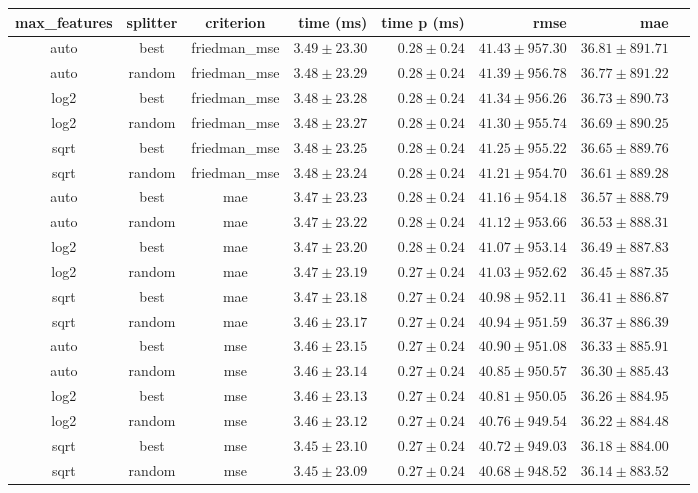 \begin{tabular}{cccrrrrr}
\toprule
\textbf{max\_features} & \textbf{splitter} & \textbf{criterion} & \textbf{time (ms)} & \textbf{time p (ms)} & \textbf{rmse} & \textbf{mae}\\
\midrule
auto & best & friedman_mse & $3.49 \pm 23.30$ & $0.28 \pm 0.24$ & $41.43 \pm 957.30$ & $36.81 \pm 891.71$\\
auto & random & friedman_mse & $3.48 \pm 23.29$ & $0.28 \pm 0.24$ & $41.39 \pm 956.78$ & $36.77 \pm 891.22$\\
log2 & best & friedman_mse & $3.48 \pm 23.28$ & $0.28 \pm 0.24$ & $41.34 \pm 956.26$ & $36.73 \pm 890.73$\\
log2 & random & friedman_mse & $3.48 \pm 23.27$ & $0.28 \pm 0.24$ & $41.30 \pm 955.74$ & $36.69 \pm 890.25$\\
sqrt & best & friedman_mse & $3.48 \pm 23.25$ & $0.28 \pm 0.24$ & $41.25 \pm 955.22$ & $36.65 \pm 889.76$\\
sqrt & random & friedman_mse & $3.48 \pm 23.24$ & $0.28 \pm 0.24$ & $41.21 \pm 954.70$ & $36.61 \pm 889.28$\\
auto & best & mae & $3.47 \pm 23.23$ & $0.28 \pm 0.24$ & $41.16 \pm 954.18$ & $36.57 \pm 888.79$\\
auto & random & mae & $3.47 \pm 23.22$ & $0.28 \pm 0.24$ & $41.12 \pm 953.66$ & $36.53 \pm 888.31$\\
log2 & best & mae & $3.47 \pm 23.20$ & $0.28 \pm 0.24$ & $41.07 \pm 953.14$ & $36.49 \pm 887.83$\\
log2 & random & mae & $3.47 \pm 23.19$ & $0.27 \pm 0.24$ & $41.03 \pm 952.62$ & $36.45 \pm 887.35$\\
sqrt & best & mae & $3.47 \pm 23.18$ & $0.27 \pm 0.24$ & $40.98 \pm 952.11$ & $36.41 \pm 886.87$\\
sqrt & random & mae & $3.46 \pm 23.17$ & $0.27 \pm 0.24$ & $40.94 \pm 951.59$ & $36.37 \pm 886.39$\\
auto & best & mse & $3.46 \pm 23.15$ & $0.27 \pm 0.24$ & $40.90 \pm 951.08$ & $36.33 \pm 885.91$\\
auto & random & mse & $3.46 \pm 23.14$ & $0.27 \pm 0.24$ & $40.85 \pm 950.57$ & $36.30 \pm 885.43$\\
log2 & best & mse & $3.46 \pm 23.13$ & $0.27 \pm 0.24$ & $40.81 \pm 950.05$ & $36.26 \pm 884.95$\\
log2 & random & mse & $3.46 \pm 23.12$ & $0.27 \pm 0.24$ & $40.76 \pm 949.54$ & $36.22 \pm 884.48$\\
sqrt & best & mse & $3.45 \pm 23.10$ & $0.27 \pm 0.24$ & $40.72 \pm 949.03$ & $36.18 \pm 884.00$\\
sqrt & random & mse & $3.45 \pm 23.09$ & $0.27 \pm 0.24$ & $40.68 \pm 948.52$ & $36.14 \pm 883.52$\\
\bottomrule
\end{tabular}
